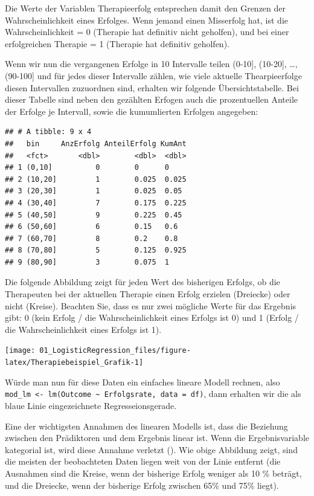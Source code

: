 \documentclass[
]{article}
\begin{document}
Die Werte der Variablen Therapieerfolg entsprechen damit den Grenzen der Wahrscheinlichkeit eines Erfolges. Wenn jemand einen Misserfolg hat, ist die Wahrscheinlichkeit = 0 (Therapie hat definitiv nicht geholfen), und bei einer erfolgreichen Therapie = 1 (Therapie hat definitiv geholfen).

Wenn wir nun die vergangenen Erfolge in 10 Intervalle teilen (0-10{]}, (10-20{]}, \ldots, (90-100{]} und für jedes dieser Intervalle zählen, wie viele aktuelle Thearpieerfolge diesen Intervallen zuzuordnen sind, erhalten wir folgende Übersichtstabelle. Bei dieser Tabelle sind neben den gezählten Erfogen auch die prozentuellen Anteile der Erfolge je Intervall, sowie die kumumlierten Erfolgen angegeben:

\begin{verbatim}
## # A tibble: 9 x 4
##   bin     AnzErfolg AnteilErfolg KumAnt
##   <fct>       <dbl>        <dbl>  <dbl>
## 1 (0,10]          0        0      0    
## 2 (10,20]         1        0.025  0.025
## 3 (20,30]         1        0.025  0.05 
## 4 (30,40]         7        0.175  0.225
## 5 (40,50]         9        0.225  0.45 
## 6 (50,60]         6        0.15   0.6  
## 7 (60,70]         8        0.2    0.8  
## 8 (70,80]         5        0.125  0.925
## 9 (80,90]         3        0.075  1
\end{verbatim}

Die folgende Abbildung zeigt für jeden Wert des bisherigen Erfolgs, ob die Therapeuten bei der aktuellen Therapie einen Erfolg erzielen (Dreiecke) oder nicht (Kreise). Beachten Sie, dass es nur zwei mögliche Werte für das Ergebnis gibt: 0 (kein Erfolg / die Wahrscheinlichkeit eines Erfolgs ist 0) und 1 (Erfolg / die Wahrscheinlichkeit eines Erfolgs ist 1).

\begin{center}\texttt{[image: 01\_LogisticRegression\_files/figure-latex/Therapiebeispiel\_Grafik-1]} \end{center}

Würde man nun für diese Daten ein einfaches lineare Modell rechnen, also \texttt{mod\_lm\ \textless{}-\ lm(Outcome\ \textasciitilde{}\ Erfolgsrate,\ data\ =\ df)}, dann erhalten wir die als blaue Linie eingezeichnete Regresseionsgerade.

Eine der wichtigsten Annahmen des linearen Modells ist, dass die Beziehung zwischen den Prädiktoren und dem Ergebnis linear ist. Wenn die Ergebnisvariable kategorial ist, wird diese Annahme verletzt (). Wie obige Abbildung zeigt, sind die meisten der beobachteten Daten liegen weit von der Linie entfernt (die Ausnahmen sind die Kreise, wenn der bisherige Erfolg weniger als 10 \% beträgt, und die Dreiecke, wenn der bisherige Erfolg zwischen 65\% und 75\% liegt).
\end{document}
